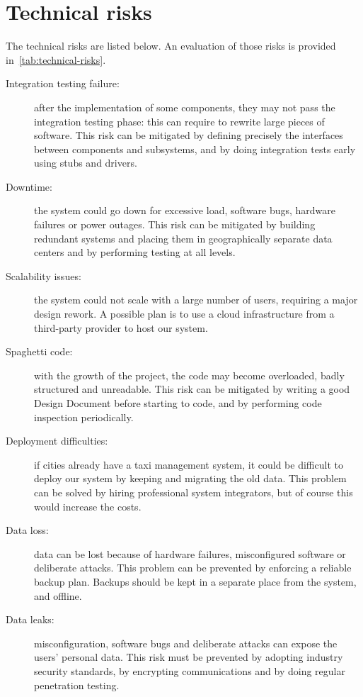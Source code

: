 \section{Technical risks}

The technical risks are listed below. An evaluation of those risks is provided in~\autoref{tab:technical-risks}.

\begin{description}

    \item[Integration testing failure:] after the implementation of some components, they may not pass the integration testing phase: this can require to rewrite large pieces of software. This risk can be mitigated by defining precisely the interfaces between components and subsystems, and by doing integration tests early using stubs and drivers.

    \item[Downtime:] the system could go down for excessive load, software bugs, hardware failures or power outages. This risk can be mitigated by building redundant systems and placing them in geographically separate data centers and by performing testing at all levels.

    \item[Scalability issues:] the system could not scale with a large number of users, requiring a major design rework. A possible plan is to use a cloud infrastructure from a third-party provider to host our system.

    \item[Spaghetti code:] with the growth of the project, the code may become overloaded, badly structured and unreadable. This risk can be mitigated by writing a good Design Document before starting to code, and by performing code inspection periodically.

    \item[Deployment difficulties:] if cities already have a taxi management system, it could be difficult to deploy our system by keeping and migrating the old data. This problem can be solved by hiring professional system integrators, but of course this would increase the costs.

    \item[Data loss:] data can be lost because of hardware failures, misconfigured software or deliberate attacks. This problem can be prevented by enforcing a reliable backup plan. Backups should be kept in a separate place from the system, and offline.

    \item[Data leaks:] misconfiguration, software bugs and deliberate attacks can expose the users' personal data. This risk must be prevented by adopting industry security standards, by encrypting communications and by doing regular penetration testing.

\end{description}

